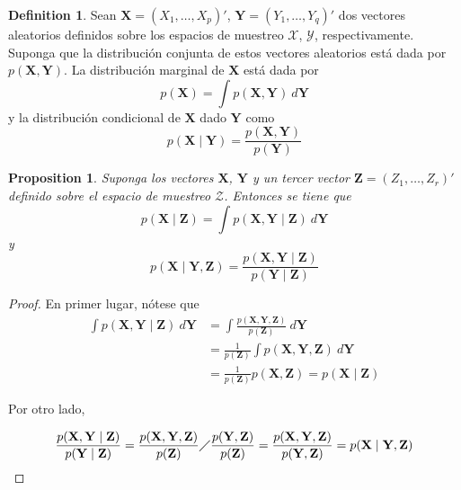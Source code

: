 \documentclass[
  spanish,
  letter]{book}
\newtheorem{proposition}{Proposition}[chapter]
\theoremstyle{definition}
\newtheorem{definition}{Definition}[chapter]
\theoremstyle{definition}
\theoremstyle{definition}
\theoremstyle{remark}
\begin{document}
\begin{definition}
\protect\hypertarget{def:unnamed-chunk-4}{}{\label{def:unnamed-chunk-4} }Sean \(\mathbf{X}=(X_1,\ldots,X_p)'\), \(\mathbf{Y}=(Y_1,\ldots,Y_q)'\) dos vectores aleatorios definidos sobre los espacios de muestreo \(\mathcal{X}\), \(\mathcal{Y}\), respectivamente. Suponga que la distribución conjunta de estos vectores aleatorios está dada por \(p(\mathbf{X},\mathbf{Y})\). La distribución marginal de \(\mathbf{X}\) está dada por
\begin{equation}
p(\mathbf{X})=\int p(\mathbf{X},\mathbf{Y})\ d\mathbf{Y}
\end{equation}
y la distribución condicional de \(\mathbf{X}\) dado \(\mathbf{Y}\) como
\begin{equation}
p(\mathbf{X} \mid \mathbf{Y})
=\frac{p(\mathbf{X},\mathbf{Y})}{p(\mathbf{Y})}
\end{equation}
\end{definition}

\begin{proposition}
\protect\hypertarget{prp:unnamed-chunk-5}{}{\label{prp:unnamed-chunk-5} }Suponga los vectores \(\mathbf{X}\), \(\mathbf{Y}\) y un tercer vector \(\mathbf{Z}=(Z_1,\ldots,Z_r)'\) definido sobre el espacio de muestreo \(\mathcal{Z}\). Entonces se tiene que
\begin{equation}
p(\mathbf{X} \mid \mathbf{Z})=\int p(\mathbf{X},\mathbf{Y} \mid \mathbf{Z})\ d\mathbf{Y}
\end{equation}
y
\begin{equation}
p(\mathbf{X} \mid \mathbf{Y},\mathbf{Z})=\frac{p(\mathbf{X},\mathbf{Y} \mid \mathbf{Z})}{p(\mathbf{Y} \mid \mathbf{Z})}
\end{equation}
\end{proposition}

\begin{proof}
\iffalse{} {Proof. } \fi{}En primer lugar, nótese que
\begin{align*}
\int p(\mathbf{X},\mathbf{Y} \mid \mathbf{Z})\ d\mathbf{Y}&=
\int \frac{p(\mathbf{X},\mathbf{Y},\mathbf{Z})}{p(\mathbf{Z})}\ d\mathbf{Y}\\
&=\frac{1}{p(\mathbf{Z})} \int p(\mathbf{X},\mathbf{Y},\mathbf{Z}) \ d\mathbf{Y}\\
&=\frac{1}{p(\mathbf{Z})} p(\mathbf{X},\mathbf{Z})=p(\mathbf{X} \mid \mathbf{Z})
\end{align*}

Por otro lado,

\begin{align*}
\frac{p(\mathbf{X},\mathbf{Y} \mid \mathbf{Z})}{p(\mathbf{Y} \mid \mathbf{Z})}=
\frac{p(\mathbf{X},\mathbf{Y},\mathbf{Z})}{p(\mathbf{Z})} \diagup
\frac{p(\mathbf{Y},\mathbf{Z})}{p(\mathbf{Z})}
=\frac{p(\mathbf{X},\mathbf{Y},\mathbf{Z})}{p(\mathbf{Y},\mathbf{Z})}=p(\mathbf{X} \mid \mathbf{Y},\mathbf{Z})
\end{align*}
\end{proof}
\end{document}

